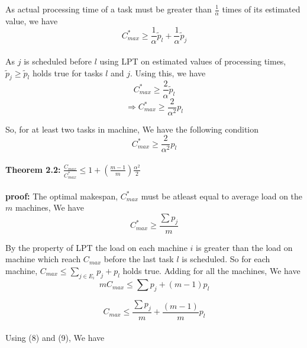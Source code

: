 \documentclass[10pt, conference, compsocconf]{IEEEtran}
\begin{document}
As actual processing time of a task must be greater than $\frac{1}{\alpha}$ times of its estimated value, we have
\begin{equation}\nonumber 
C_{max}^{*} \geq \frac{1}{\alpha}\tilde p_l +  \frac{1}{\alpha} \tilde p_j 
\end{equation}
\\
As $j$ is scheduled before $l$ using LPT on estimated values of processing times,  $\tilde p_j\geq   \tilde p_l$ holds true for tasks $l$ and $j$.  Using this, we have\\

\begin{equation}\nonumber
 C_{max}^{*} \geq \frac{2}{\alpha}\tilde p_l
 \end{equation}
\begin{equation}\nonumber 
\Rightarrow C_{max}^{*} \geq {\frac{2}{\alpha^{2}}} p_l  \end{equation}

So, for at least two tasks in machine, We have the following condition\\
\begin{equation}
C_{max}^{*} \geq {\frac{2}{\alpha^{2}}} p_l 
\end{equation}
\\
\textbf{Theorem 2.2:} $\frac{C_{max}}{C_{max}^{*}} \leq 1 + (\frac{m-1}{m})\frac{\alpha^{2}}{2}$\\
\\
\textbf{proof:} The optimal makespan, $C_{max}^{*}$ must be atleast equal to average load on the $m$ machines, We have\\
\begin{equation}
C_{max}^{*}\geq\frac{\sum p_j}{m}
\end{equation}

By the property of LPT the load on each machine $i$ is greater than the load on machine which reach $C_{max}$ before the last task $l$ is scheduled. So for each machine, $C_{max} \leq  \sum_{j \in E_i}^{}{p_j} + p_l$ holds true.  Adding for all the machines, We have\\

\begin{equation}\nonumber 
mC_{max} \leq  \sum {p_j} + (m-1)p_l
\end{equation}

\begin{equation}
C_{max} \leq  \frac{\sum {p_j}}{m} + \frac{(m-1)}{m}p_l
\end{equation}
\\
Using (8) and (9), We have\\
\end{document}
